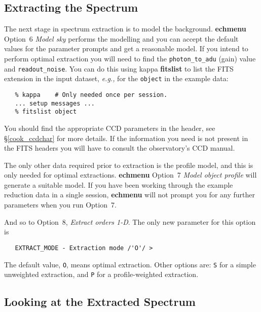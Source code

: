 \documentclass[twoside,11pt]{article}
\newcommand{\htmlref}[2]{#1}
\newcommand{\xref}[3]{#1}
\newcommand{\scspec}[2]{#1}
\newcommand{\scspec}[2]{#2}
\begin{document}
\subsection{Extracting the Spectrum}

The next stage in spectrum extraction is to model the background.
\xref{{\bf echmenu}}{sun152}{ECHMENU}
\xref{Option~6 {\sl Model sky}}{sun152}{option6}
performs the modelling and you can accept the default values for
the parameter prompts and get a reasonable model.
If you intend to perform optimal extraction you will need to find the
\xref{{\tt photon\_to\_adu}}{sun152}{par_PHOTON_TO_ADU} (gain) value and
\xref{{\tt readout\_noise}}{sun152}{par_READOUT_NOISE}\@.
You can do this using \xref{{\sc kappa}}{sun95}{}
\xref{{\bf fitslist}}{sun95}{FITSLIST}
to list the FITS extension in the input dataset, {\it{e.g.,}}
for the \verb+object+ in the example data:

{
\scspec{\small}{ }
\begin{verbatim}
   % kappa    # Only needed once per session.
   ... setup messages ...
   % fitslist object
\end{verbatim}
}

You should find the appropriate CCD parameters in the header, see
\scspec{\S\ref{cook_ccdchar}}
{\htmlref{Looking at FITS Header Cards: CCD Characteristics}{cook_ccdchar}}
for more details.  If the information you need is not present in the FITS
headers you will have to consult the observatory's CCD manual.

The only other data required prior to extraction is the profile model,
and this is only needed for optimal extractions.
{\bf echmenu} \xref{Option~7 {\sl Model object profile}}{sun152}{option7}
will generate a suitable model.
If you have been working through the example reduction data in a
single session, {\bf echmenu} will not prompt you for any further parameters
when you run Option~7.

And so to \xref{Option~8, {\sl Extract orders 1-D}}{sun152}{option8}.
The only new parameter for this option is

{
\scspec{\small}{ }
\begin{verbatim}
   EXTRACT_MODE - Extraction mode /'O'/ >
\end{verbatim}
}

The default value, \verb+O+, means optimal extraction.  Other options are:
\verb+S+ for a simple unweighted extraction, and \verb+P+ for a
profile-weighted extraction.


\subsection{Looking at the Extracted Spectrum}
\end{document}

